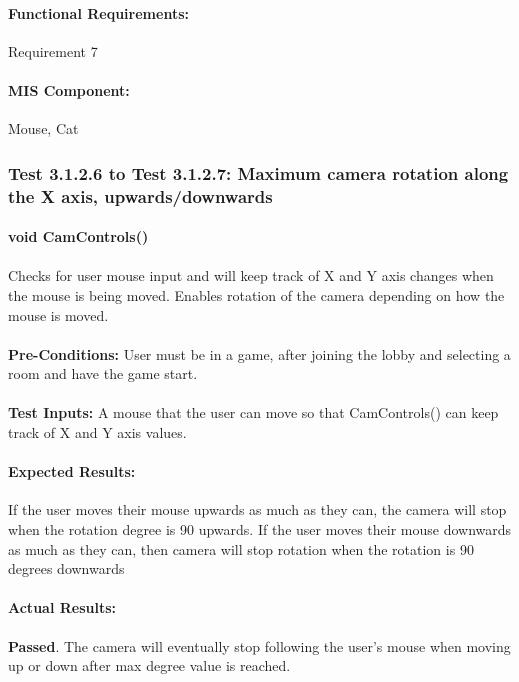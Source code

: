 \documentclass{article}
\begin{document}
    \paragraph{Functional Requirements:} Requirement 7
    \paragraph{MIS Component:} Mouse, Cat
    
    \subsubsection{Test 3.1.2.6 to Test 3.1.2.7: Maximum camera rotation along the X axis, upwards/downwards}
    \paragraph{}\textbf{void CamControls()}
    \paragraph{} Checks for user mouse input and will keep track of X and Y axis changes when the mouse is being moved. Enables rotation of the camera depending on how the mouse is moved.
    \paragraph{}\textbf{Pre-Conditions:} User must be in a game, after joining the lobby and selecting a room and have the game start.
    \paragraph{}\textbf{Test Inputs:} A mouse that the user can move so that CamControls() can keep track of X and Y axis values.
    \paragraph{Expected Results:} If the user moves their mouse upwards as much as they can, the camera will stop when the rotation degree is 90 upwards. If the user moves their mouse downwards as much as they can, then camera will stop rotation when the rotation is 90 degrees downwards
    \paragraph{Actual Results:} \textbf{Passed}. The camera will eventually stop following the user's mouse when moving up or down after max degree value is reached.
\end{document}
